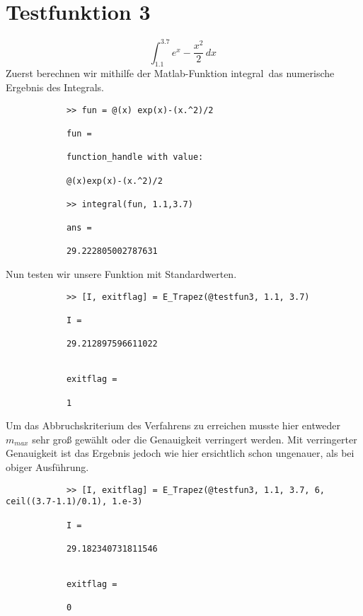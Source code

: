 \documentclass[11pt,titlepage]{article}
\begin{document}
	\section{Testfunktion 3}
		\begin{displaymath}
			\int_{1.1}^{3.7} e^{x} - \dfrac{x^2}{2}  \, dx\
		\end{displaymath}
		Zuerst berechnen wir mithilfe der Matlab-Funktion \glqq integral\grqq \, das numerische Ergebnis des Integrals.
		\begin{lstlisting}
			>> fun = @(x) exp(x)-(x.^2)/2
			
			fun =
			
			function_handle with value:
			
			@(x)exp(x)-(x.^2)/2
			
			>> integral(fun, 1.1,3.7)
			
			ans =
			
			29.222805002787631
		\end{lstlisting}
		Nun testen wir unsere Funktion mit Standardwerten.
		\begin{lstlisting}
			>> [I, exitflag] = E_Trapez(@testfun3, 1.1, 3.7)
			
			I =
			
			29.212897596611022
			
			
			exitflag =
			
			1
		\end{lstlisting}
		Um das Abbruchskriterium des Verfahrens zu erreichen musste hier entweder $m_{max}$ sehr groß gewählt oder die Genauigkeit verringert werden.
		Mit verringerter Genauigkeit ist das Ergebnis jedoch wie hier ersichtlich schon ungenauer, als bei obiger Ausführung.
		\begin{lstlisting}
			>> [I, exitflag] = E_Trapez(@testfun3, 1.1, 3.7, 6, ceil((3.7-1.1)/0.1), 1.e-3)
			
			I =
			
			29.182340731811546
			
			
			exitflag =
			
			0
		\end{lstlisting}
		
\end{document}
